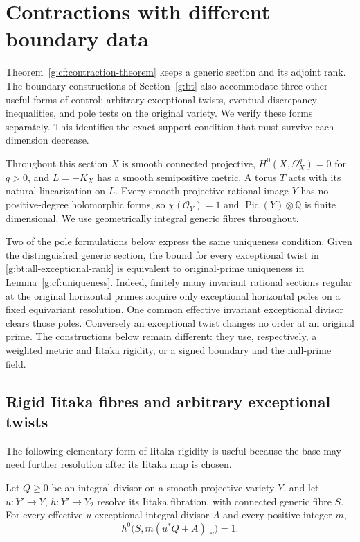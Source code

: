 \section{Contractions with different boundary data}
\label{g:ba}

Theorem~\ref{g:cf:contraction-theorem} keeps a generic section and its
adjoint rank. The boundary constructions of Section~\ref{g:bt} also accommodate
three other useful forms of control: arbitrary exceptional twists,
eventual discrepancy inequalities, and pole tests on the original
variety.  We verify these forms separately.  This identifies the exact
support condition that must survive each dimension decrease.

Throughout this section $X$ is smooth connected projective,
$H^0(X,\Omega_X^q)=0$ for $q>0$, and $L=-K_X$ has a smooth semipositive
metric.  A torus $T$ acts with its natural linearization on $L$.
Every smooth projective rational image $Y$ has no positive-degree
holomorphic forms, so $\chi(\mathcal O_Y)=1$ and
$\operatorname{Pic}(Y)\otimes\mathbb Q$ is finite dimensional.
We use geometrically integral generic fibres throughout.

Two of the pole formulations below express the same uniqueness
condition. Given the distinguished generic section, the bound for
every exceptional twist in \eqref{g:bt:all-exceptional-rank} is equivalent
to original-prime uniqueness in Lemma~\ref{g:cf:uniqueness}.
Indeed, finitely many invariant rational sections regular at the
original horizontal primes acquire only exceptional horizontal poles
on a fixed equivariant resolution. One common effective invariant
exceptional divisor clears those poles. Conversely an exceptional
twist changes no order at an original prime. The constructions below
remain different: they use, respectively, a weighted metric and Iitaka
rigidity, or a signed boundary and the null-prime field.

\subsection{Rigid Iitaka fibres and arbitrary exceptional twists}
\label{g:ba:iitaka}

The following elementary form of Iitaka rigidity is useful because the
base may need further resolution after its Iitaka map is chosen.

\begin{lemma}\label{g:ba:rigidity}
Let $Q\geq0$ be an integral divisor on a smooth projective variety $Y$,
and let $u:Y'\to Y$, $h:Y'\to Y_2$ resolve its Iitaka fibration, with
connected generic fibre $S$.  For every effective $u$-exceptional
integral divisor $A$ and every positive integer $m$,
\[
             h^0\bigl(S,m(u^*Q+A)|_S\bigr)=1.
\]
\end{lemma}

